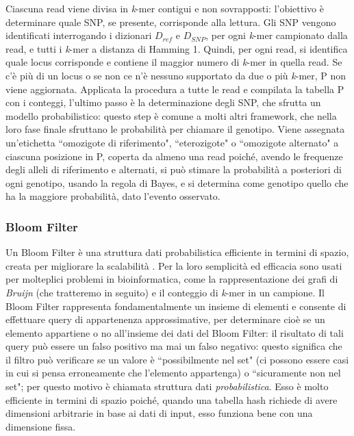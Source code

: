 \documentclass[../main.tex]{subfiles}
\begin{document}
Ciascuna read viene divisa in \textit{k}-mer contigui e non sovrapposti: l'obiettivo è determinare quale SNP, se presente, corrisponde alla lettura. Gli SNP vengono identificati interrogando i dizionari $D_{ref}$ e $D_{SNP}$, per ogni \textit{k}-mer campionato dalla read, e tutti i \textit{k}-mer a distanza di Hamming 1. Quindi, per ogni read, si identifica quale locus corrisponde e contiene il maggior numero di \textit{k}-mer in quella read. Se c'è più di un locus o se non ce n'è nessuno supportato da due o più \textit{k}-mer, P non viene aggiornata. Applicata la procedura a tutte le read e compilata la tabella P con i conteggi, l'ultimo passo è la determinazione degli SNP, che sfrutta un modello probabilistico: questo step è comune a molti altri framework, che nella loro fase finale sfruttano le probabilità per chiamare il genotipo. Viene assegnata un'etichetta ``omozigote di riferimento", ``eterozigote" o ``omozigote alternato" a ciascuna posizione in P, coperta da almeno una read poiché, avendo le frequenze degli alleli di riferimento e alternati, si può stimare la probabilità a posteriori di ogni genotipo, usando la regola di Bayes, e si determina come genotipo quello che ha la maggiore probabilità, dato l'evento osservato. \\



\subsubsection{Bloom Filter}
\label{BloomFilter}
Un Bloom Filter è una struttura dati probabilistica efficiente in termini di spazio, creata per migliorare la scalabilità \cite{sun-medvedev2018vargeno}. Per la loro semplicità ed efficacia sono usati per molteplici problemi in bioinformatica, come la rappresentazione dei grafi di \textit{Bruijn} (che tratteremo in seguito) e il conteggio di \textit{k}-mer in un campione. Il Bloom Filter rappresenta fondamentalmente un insieme di elementi e consente di effettuare query di appartenenza approssimative, per determinare cioè se un elemento appartiene o no all'insieme dei dati del Bloom Filter: il risultato di tali query può essere un falso positivo ma mai un falso negativo: questo significa che il filtro può verificare se un valore è ``possibilmente nel set" (ci possono essere casi in cui si pensa erroneamente che l'elemento appartenga) o ``sicuramente non nel set"; per questo motivo è chiamata struttura dati \textit{probabilistica}. Esso è molto efficiente in termini di spazio poiché, quando una tabella hash richiede di avere dimensioni arbitrarie in base ai dati di input, esso funziona bene con una dimensione fissa.
\end{document}
